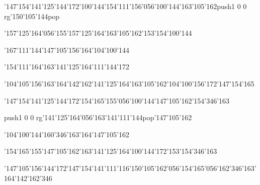 \null\vfill\ipa\centerline{\enskip\char'147\char'154\char'141\char'125\char'144\char'172\enskip\char'100\char'144\enskip\char'154\char'111\char'156\char'056\char'100\char'144\enskip\enskip\enskip\char'163\char'105\char'162\enskip\pdfcolorstack\match push{1 0 0 rg}\char'150\char'105\char'144\pdfcolorstack\match pop{}}\medskip\centerline{\enskip\char'157\char'125\char'164\char'056\char'155\char'157\char'125\char'164\enskip\enskip\enskip\enskip\char'163\char'105\char'162\enskip\enskip\enskip\enskip\enskip\char'153\char'154\char'100\char'144}\medskip\centerline{\enskip\char'167\char'111\char'144\enskip\enskip\enskip\enskip\char'147\char'105\char'156\char'164\enskip\enskip\enskip\char'104\char'100\char'144}\medskip\centerline{\enskip\enskip\enskip\enskip\char'154\char'111\char'164\enskip\enskip\enskip\enskip\enskip\char'163\char'141\char'125\char'164\enskip\char'111\char'144\char'172\enskip\enskip\enskip\enskip\enskip}\medskip\centerline{\enskip\enskip\char'104\char'105\char'156\char'163\char'164\enskip\enskip\enskip\char'142\char'162\char'141\char'125\char'164\enskip\char'163\char'105\char'162\enskip\enskip\enskip\char'104\char'100\char'156\char'172\enskip\char'147\char'154\char'165}\medskip\vfill\footline{\hfil\tt\folio\hfil}\eject
\null\vfill\ipa\centerline{\enskip\char'147\char'154\char'141\char'125\char'144\char'172\enskip\enskip\enskip\enskip\char'154\char'165\char'155\char'056\char'100\char'144\enskip\enskip\enskip\char'147\char'105\char'162\enskip\char'154\char'346\char'163}\medskip\centerline{\enskip\pdfcolorstack\match push{1 0 0 rg}\char'141\char'125\char'164\char'056\char'163\char'141\char'111\char'144\pdfcolorstack\match pop{}\enskip\enskip\enskip\enskip\char'147\char'105\char'162\enskip\enskip\enskip\enskip\enskip\enskip\enskip\enskip\enskip}\medskip\centerline{\enskip\char'104\char'100\char'144\enskip\enskip\enskip\enskip\char'160\char'346\char'163\char'164\enskip\enskip\enskip\char'147\char'105\char'162}\medskip\centerline{\enskip\enskip\enskip\enskip\char'154\char'165\char'155\enskip\char'147\char'105\char'162\enskip\char'163\char'141\char'125\char'164\enskip\char'100\char'144\char'172\enskip\char'153\char'154\char'346\char'163}\medskip\centerline{\enskip\enskip\char'147\char'105\char'156\char'144\char'172\enskip\enskip\enskip\char'147\char'154\char'141\char'111\char'116\enskip\char'150\char'105\char'162\char'056\char'154\char'165\char'056\char'162\char'346\char'163\char'164\enskip\char'142\char'162\char'346}\medskip\vfill\footline{\hfil\tt\folio\hfil}\eject
